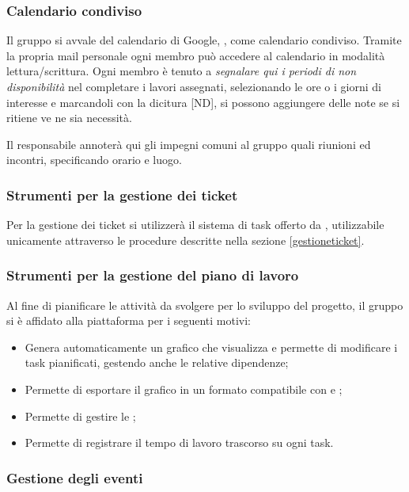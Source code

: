 	\subsubsection{Calendario condiviso}
	\label{Calendario condiviso}
			
	Il gruppo si avvale del calendario di Google, , come calendario condiviso.
	Tramite la propria mail personale ogni membro può accedere al calendario in modalità lettura/scrittura.
	Ogni membro è tenuto a \emph{segnalare qui i periodi di non disponibilità} nel completare i lavori assegnati, selezionando le ore o i giorni di interesse e marcandoli con la dicitura [ND], si possono aggiungere delle note se si ritiene ve ne sia necessità. 
	
	Il responsabile annoterà qui gli impegni comuni al gruppo quali riunioni ed incontri, specificando orario e luogo.
	
	\subsubsection{Strumenti per la gestione dei ticket}
	\label{teamwork}
	Per la gestione dei ticket si utilizzerà il sistema di task offerto da , utilizzabile unicamente attraverso le procedure descritte nella sezione \ref{gestioneticket}.
	
	\subsubsection{Strumenti per la gestione del piano di lavoro}
	
	Al fine di pianificare le attività da svolgere per lo sviluppo del progetto, il gruppo si è affidato alla piattaforma  per i seguenti motivi:
	\begin{itemize}
		\item Genera automaticamente un grafico  che visualizza e permette di modificare i task pianificati, gestendo anche le relative dipendenze;
		\item Permette di esportare il grafico  in un formato compatibile con  e ;
		\item Permette di gestire le ;
		\item Permette di registrare il tempo di lavoro trascorso su ogni task.
	\end{itemize}

	\subsubsection{Gestione degli eventi}
	
